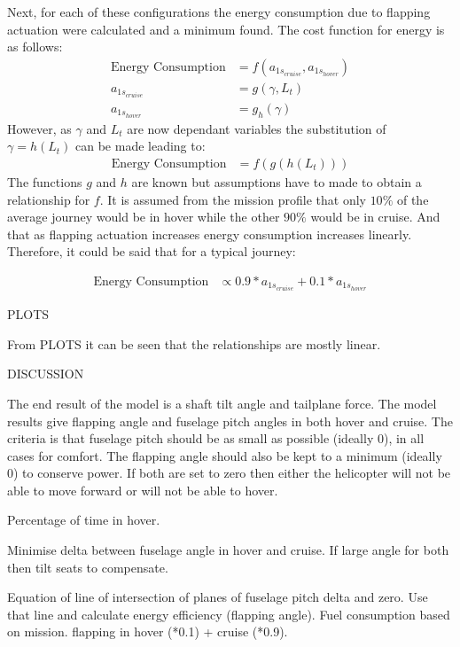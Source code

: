\documentclass[11pt,a4paper]{article}
\begin{document}
Next, for each of these configurations the energy consumption due to flapping actuation were calculated and a minimum found.
The cost function for energy is as follows:
\begin{align}
    \text{Energy Consumption}&=f(a_{1s_{cruise}},a_{1s_{hover}})\\
    a_{1s_{cruise}}&=g(\gamma,L_t)\\
    a_{1s_{hover}}&=g_h(\gamma)
\end{align}{}
However, as $\gamma$ and $L_t$ are now dependant variables the substitution of $\gamma=h(L_t)$ can be made leading to:
\begin{align}
    \text{Energy Consumption}&=f(g(h(L_t)))
\end{align}{}
The functions $g$ and $h$ are known but assumptions have to made to obtain a relationship for $f$. It is assumed from the mission profile that only $10\%$ of the average journey would be in hover while the other $90\%$ would be in cruise. And that as flapping actuation increases energy consumption increases linearly. Therefore, it could be said that for a typical journey:

\begin{align}
        \text{Energy Consumption}&\propto 0.9*a_{1s_{cruise}}+0.1*a_{1s_{hover}}
\end{align}{}





PLOTS

From PLOTS it can be seen that the relationships are mostly linear.

DISCUSSION

The end result of the model is a shaft tilt angle and tailplane force.
The model results give flapping angle and fuselage pitch angles in both hover and cruise.
The criteria is that fuselage pitch should  be as small as possible (ideally 0), in all cases for comfort.
The flapping angle should also be kept to a minimum (ideally 0) to conserve power.
If both are set to zero then either the helicopter will not be able to move forward or will not be able to hover.

Percentage of time in hover. 

Minimise delta between fuselage angle in hover and cruise. If large angle for both then tilt seats to compensate.

Equation of line of intersection of planes of fuselage pitch delta and zero. Use that line and calculate energy efficiency (flapping angle). Fuel consumption based on mission. flapping in hover (*0.1) + cruise (*0.9).
\end{document}
